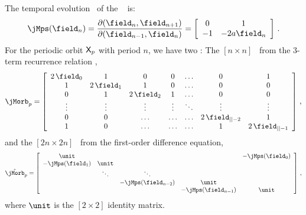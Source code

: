 The temporal evolution \jacobianM\ of the \HenonMap\  is:
\[
\jMps(\field_n) = \frac{\partial (\field_n, \field_{n+1})}{\partial (\field_{n-1}, \field_{n})}
=
\left[
\begin{array}{cc}
 0 & 1 \\
 -1 & -2 a \field_n \\
\end{array}
\right]
\,.
\]
For the periodic orbit $\mathsf{X}_p$ with period $n$, we have two \jacobianOrbs:
The $[n \times n]$ \jacobianOrb\ from the 3-term recurrence relation
,
\[
\jMorb_p =
\left[
\begin{array}{ccccccc}
2\,\field_0 & 1 & 0 & 0 & \dots & 0 & 1\\
1 & 2\,\field_1 & 1 & 0 & \dots & 0 & 0\\
0 & 1 & 2\,\field_2 & 1 & \dots & 0 & 0\\
\vdots & \vdots & \vdots & \vdots & \ddots & \vdots & \vdots\\
0 & 0 & \dots & \dots & \dots & 2\,\field_{\cl{}-2} & 1\\
1 & 0 & \dots & \dots & \dots & 1 & 2\,\field_{\cl{}-1}
\end{array}
\right]
\,,
\]
and the $[2n \times 2n]$ \jacobianOrb\ from the
first-order difference equation,
\[
\hat{\jMorb}_p =
\left[
\begin{array}{ccccc}
 {\unit} &  &  &  & -\jMps(\field_0) \\
 -\jMps(\field_1) & {\unit} &  &  &  \\
  & \ddots & \ddots &  &  \\
  &  & -\jMps(\field_{n-2}) & {\unit} &  \\
  &  &  & -\jMps(\field_{n-1}) & {\unit} \\
\end{array}
\right] \, ,
\]
where $\unit$ is the $[2\times 2]$ identity matrix.

